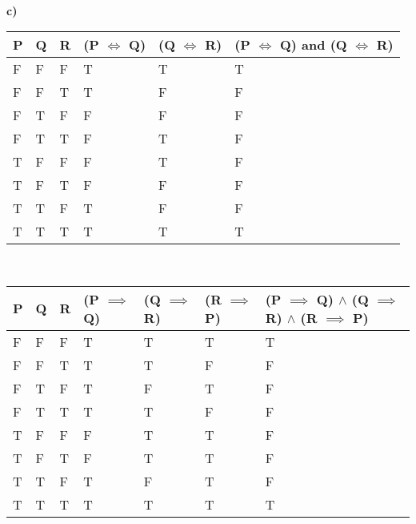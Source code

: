 \documentclass[12pt]{article}
\begin{document}
\\
\textbf{c) }
\begin{table}[!h]
\begin{tabular}{|l|l|l|l|l|l|}
\hline
P & Q & R & (P $\iff$ Q) & (Q $\iff$ R) & (P $\iff$ Q) and (Q $\iff$ R) \\ \hline
F & F & F & T         & T         & T                       \\ \hline
F & F & T & T         & F         & F                       \\ \hline
F & T & F & F         & F         & F                       \\ \hline
F & T & T & F         & T         & F                       \\ \hline
T & F & F & F         & T         & F                       \\ \hline
T & F & T & F         & F         & F                       \\ \hline
T & T & F & T         & F         & F                       \\ \hline
T & T & T & T         & T         & T                       \\ \hline
\end{tabular}
\end{table}\\
\begin{table}[!h]
\begin{tabular}{|l|l|l|l|l|l|l|}
\hline
P & Q & R & (P $\implies$ Q) & (Q $\implies$ R) & (R $\implies$ P) & (P $\implies$ Q) $\land$ (Q $\implies$ R) $\land$ (R $\implies$ P) \\ \hline
F & F & F & T & T & T & T \\ \hline
F & F & T & T & T & F & F \\ \hline
F & T & F & T & F & T & F \\ \hline
F & T & T & T & T & F & F \\ \hline
T & F & F & F & T & T & F \\ \hline
T & F & T & F & T & T & F \\ \hline
T & T & F & T & F & T & F \\ \hline
T & T & T & T & T & T & T \\ \hline
\end{tabular}
\end{table}
\newpage
\end{document}
